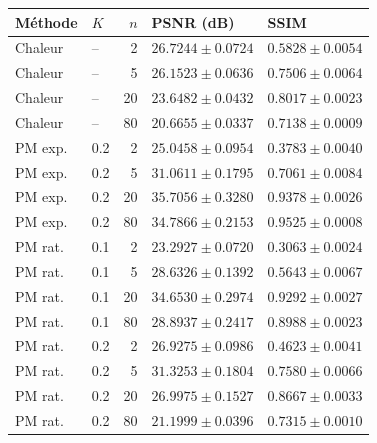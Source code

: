 \begin{tabular}{llrll}
\toprule
Méthode & $K$ & $n$ & PSNR (dB) & SSIM \\
\midrule
Chaleur & -- & 2 & $26.7244 \pm 0.0724$ & $0.5828 \pm 0.0054$ \\
Chaleur & -- & 5 & $26.1523 \pm 0.0636$ & $0.7506 \pm 0.0064$ \\
Chaleur & -- & 20 & $23.6482 \pm 0.0432$ & $0.8017 \pm 0.0023$ \\
Chaleur & -- & 80 & $20.6655 \pm 0.0337$ & $0.7138 \pm 0.0009$ \\
PM exp. & 0.2 & 2 & $25.0458 \pm 0.0954$ & $0.3783 \pm 0.0040$ \\
PM exp. & 0.2 & 5 & $31.0611 \pm 0.1795$ & $0.7061 \pm 0.0084$ \\
PM exp. & 0.2 & 20 & $35.7056 \pm 0.3280$ & $0.9378 \pm 0.0026$ \\
PM exp. & 0.2 & 80 & $34.7866 \pm 0.2153$ & $0.9525 \pm 0.0008$ \\
PM rat. & 0.1 & 2 & $23.2927 \pm 0.0720$ & $0.3063 \pm 0.0024$ \\
PM rat. & 0.1 & 5 & $28.6326 \pm 0.1392$ & $0.5643 \pm 0.0067$ \\
PM rat. & 0.1 & 20 & $34.6530 \pm 0.2974$ & $0.9292 \pm 0.0027$ \\
PM rat. & 0.1 & 80 & $28.8937 \pm 0.2417$ & $0.8988 \pm 0.0023$ \\
PM rat. & 0.2 & 2 & $26.9275 \pm 0.0986$ & $0.4623 \pm 0.0041$ \\
PM rat. & 0.2 & 5 & $31.3253 \pm 0.1804$ & $0.7580 \pm 0.0066$ \\
PM rat. & 0.2 & 20 & $26.9975 \pm 0.1527$ & $0.8667 \pm 0.0033$ \\
PM rat. & 0.2 & 80 & $21.1999 \pm 0.0396$ & $0.7315 \pm 0.0010$ \\
\bottomrule
\end{tabular}

